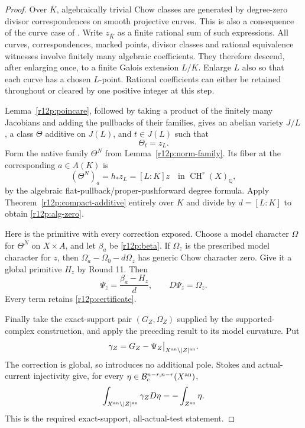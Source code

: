 \begin{proof}
Over $\overline K$, algebraically trivial Chow classes are generated
by degree-zero divisor correspondences on smooth projective curves.
This is also a consequence of the curve case of
\cite[Theorems 1--2, Proposition 3.14]{ACMV}.  Write $z_{\overline K}$
as a finite rational sum of such expressions.  All curves,
correspondences, marked points, divisor classes and rational
equivalence witnesses involve finitely many algebraic coefficients.
They therefore descend, after enlarging once, to a finite Galois
extension $L/K$.  Enlarge $L$ also so that each curve has a chosen
$L$-point.  Rational coefficients can either be retained throughout
or cleared by one positive integer at this step.

Lemma~\ref{r12p:poincare}, followed by taking a product of the
finitely many Jacobians and adding the pullbacks of their families,
gives an abelian variety $J/L$, a class $\Theta$ additive on $J(L)$,
and $t\in J(L)$ such that
\[
                              \Theta_t=z_L.
\]
Form the native family $\Theta^N$ from
Lemma~\ref{r12p:norm-family}.  Its fiber at the corresponding
$a\in A(K)$ is
\[
        (\Theta^N)_a=h_*z_L=[L:K]z
                 \quad\text{in }\operatorname{CH}^r(X)_{\mathbb Q},
\tag{R12.P13}\label{r12p:degree-norm}
\]
by the algebraic flat-pullback/proper-pushforward degree formula.
Apply Theorem~\ref{r12p:compact-additive} entirely over $K$ and
divide by $d=[L:K]$ to obtain \eqref{r12p:alg-zero}.

Here is the primitive with every correction exposed.  Choose a
model character $\Omega$ for $\Theta^N$ on $X\times A$, and let
$\beta_a$ be \eqref{r12p:beta}.  If $\Omega_z$ is the prescribed
model character for $z$, then
$\Omega_a-\Omega_0-d\Omega_z$ has generic Chow character zero.
Give it a global primitive $H_z$ by Round 11.  Then
\[
             \Psi_z=\frac{\beta_a-H_z}{d},
             \qquad D\Psi_z=\Omega_z.
\tag{R12.P14}\label{r12p:final-primitive}
\]
Every term retains \eqref{r12p:certificate}.

Finally take the exact-support pair $(G_Z,\Omega_Z)$ supplied by
the supported-complex construction, and apply the preceding result
to its model curvature.  Put
\[
       \gamma_Z=G_Z-\Psi_Z\big|_{X^{\rm an}\setminus|Z|^{\rm an}}.
\]
The correction is global, so introduces no additional pole.  Stokes
and actual-current injectivity give, for every
$\eta\in\mathcal B_c^{n-r,n-r}(X^{\rm an})$,
\[
 \int_{X^{\rm an}\setminus|Z|^{\rm an}}\gamma_ZD\eta
                         =-\int_{Z^{\rm an}}\eta.
\]
This is the required exact-support, all-actual-test statement.
\end{proof}

